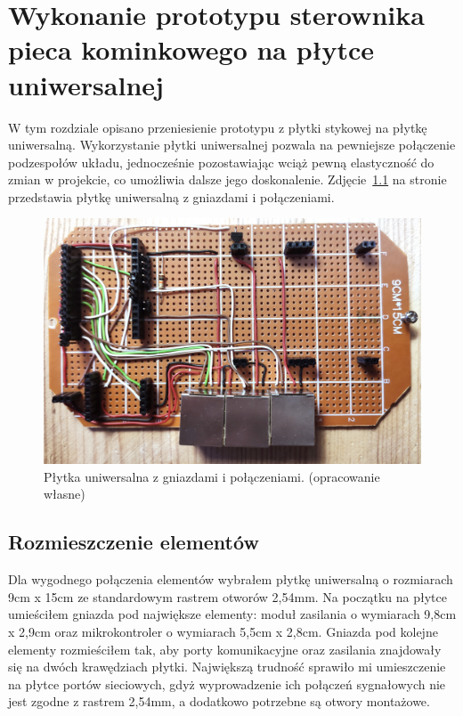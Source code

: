\documentclass[11pt]{report}
\begin{document}
 \chapter{Wykonanie prototypu sterownika pieca kominkowego na płytce uniwersalnej}\label{ch:prototyp:uniwersalna}
 W tym rozdziale opisano przeniesienie prototypu z płytki stykowej na płytkę uniwersalną.
 Wykorzystanie płytki uniwersalnej pozwala na pewniejsze połączenie podzespołów układu, jednocześnie pozostawiając wciąż pewną elastyczność do zmian w projekcie, co umożliwia dalsze jego doskonalenie.
 Zdjęcie~\ref{fig:uni_gora} na stronie~\pageref{fig:uni_gora} przedstawia płytkę uniwersalną z gniazdami i połączeniami.
\begin{figure}[ht]
\centering
\includegraphics[width=0.8 \textwidth]{fig/plytka_gora.jpg}
\caption{Płytka uniwersalna z gniazdami i połączeniami. (opracowanie własne)}
\label{fig:uni_gora}
\end{figure}
 
 \section{Rozmieszczenie elementów}
 Dla wygodnego połączenia elementów wybrałem płytkę uniwersalną o rozmiarach 9cm x 15cm ze standardowym rastrem otworów 2,54mm.
 Na początku na płytce umieściłem gniazda pod największe elementy: moduł zasilania o wymiarach 9,8cm x 2,9cm oraz mikrokontroler o wymiarach 5,5cm x 2,8cm. Gniazda pod kolejne elementy rozmieściłem tak, aby porty komunikacyjne oraz zasilania znajdowały się na dwóch krawędziach płytki. 
 Największą trudność sprawiło mi umieszczenie na płytce portów sieciowych, gdyż wyprowadzenie ich połączeń sygnałowych nie jest zgodne z rastrem 2,54mm, a dodatkowo potrzebne są otwory montażowe.
  
\end{document}
